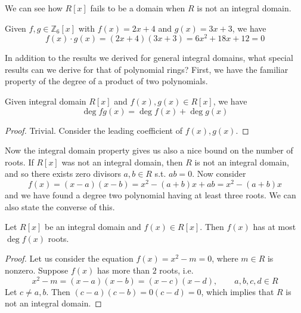   We can see how $R[x]$ fails to be a domain when $R$ is not an integral domain. 

  \begin{example}
    Given $f, g \in \mathbb{Z}_6 [x]$ with $f(x) = 2x + 4$ and $g(x) = 3x + 3$, we have 
    \begin{equation}
      f(x) \cdot g(x) = (2x + 4)(3x + 3) = 6x^2 + 18 x + 12 = 0
    \end{equation}
  \end{example}

  In addition to the results we derived for general integral domains, what special results can we derive for that of polynomial rings? First, we have the familiar property of the degree of a product of two polynomials. 

  \begin{lemma}
    Given integral domain $R[x]$ and $f(x), g(x) \in R[x]$, we have 
    \begin{equation}
      \deg{fg(x)} = \deg{f(x)} + \deg{g(x)}
    \end{equation}
  \end{lemma}
  \begin{proof}
    Trivial. Consider the leading coefficient of $f(x), g(x)$. 
  \end{proof}

  Now the integral domain property gives us also a nice bound on the number of roots. If $R[x]$ was not an integral domain, then $R$ is not an integral domain, and so there exists zero divisors $a, b \in R$ s.t. $ab = 0$. Now consider 
  \begin{equation}
    f(x) = (x - a) (x - b) = x^2 - (a + b) x + ab = x^2 - (a + b) x
  \end{equation}
  and we have found a degree two polynomial having at least three roots. We can also state the converse of this. 

  \begin{theorem}
    Let $R[x]$ be an integral domain and $f(x) \in R[x]$. Then $f(x)$ has at most $\deg{f(x)}$ roots. 
  \end{theorem}
  \begin{proof}
    Let us consider the equation $f(x) = x^2 - m = 0$, where $m \in R$ is nonzero. Suppose $f(x)$ has more than $2$ roots, i.e. 
    \begin{equation}
      x^2 - m = (x - a)(x - b) = (x - c) (x - d), \qquad a, b, c, d \in R
    \end{equation}
    Let $c \neq a, b$. Then $(c - a)(c - b) = 0 (c - d) = 0$, which implies that $R$ is not an integral domain. 
  \end{proof}

